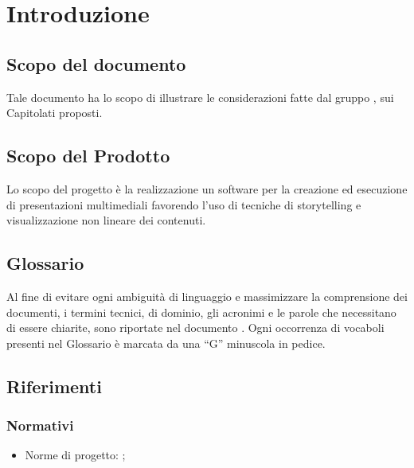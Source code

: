 \section{Introduzione}{
	\subsection{Scopo del documento}{
		Tale documento ha lo scopo di illustrare le considerazioni fatte dal gruppo \gruppo, sui Capitolati proposti.
	}
	\subsection{Scopo del Prodotto}{
		Lo scopo del progetto è la realizzazione un software per la creazione ed esecuzione di presentazioni multimediali favorendo l’uso di tecniche di storytelling e visualizzazione non lineare dei contenuti.
		}
	\subsection{Glossario}{
		Al fine di evitare ogni ambiguità di linguaggio e massimizzare la comprensione dei documenti, i termini tecnici, di dominio, gli acronimi e le parole che necessitano di essere chiarite, sono riportate nel documento \href{run:../../Esterni/\fGlossario}{\fEscapeGlossario}. Ogni occorrenza di vocaboli presenti nel Glossario è marcata da una “G” minuscola in pedice.
		}
	\subsection{Riferimenti}{
		\subsubsection{Normativi}{
			\begin{itemize}
				\item Norme di progetto: \href{run:../../Interni/\fNormeDiProgetto}{\fEscapeNormeDiProgetto};
			\end{itemize}
			}
}}
